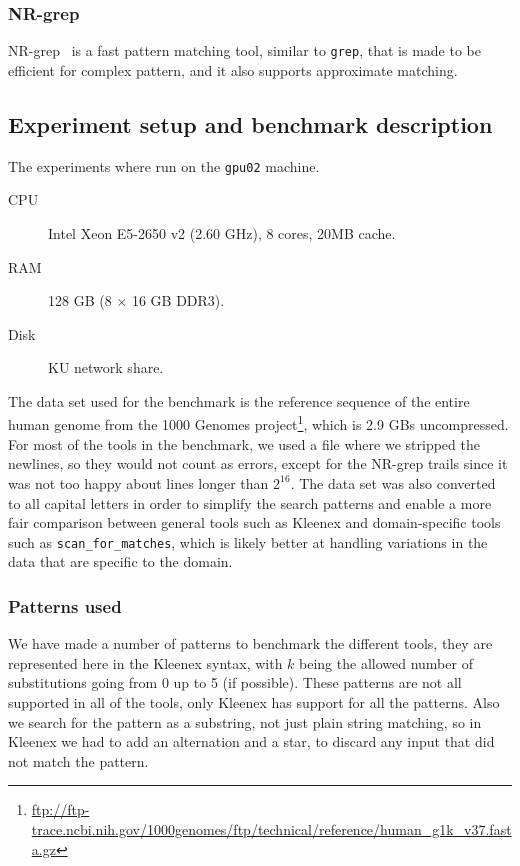 \subsubsection{NR-grep}
NR-grep~\cite{navarro2001nr} is a fast pattern matching tool, similar to
\texttt{grep}, that is made to be efficient for complex pattern, and it also
supports approximate matching.

\subsection{Experiment setup and benchmark description}
The experiments where run on the \texttt{gpu02} machine.
\begin{description}
    \item[CPU] Intel Xeon E5-2650 v2 (2.60 GHz), 8 cores, 20MB cache.
    \item[RAM] 128 GB (8 $\times$ 16 GB DDR3).
    \item[Disk] KU network share.
\end{description}

The data set used for the benchmark is the reference sequence of the entire
human genome from the 1000 Genomes
project\footnote{\url{ftp://ftp-trace.ncbi.nih.gov/1000genomes/ftp/technical/reference/human_g1k_v37.fasta.gz}},
which is 2.9 GBs uncompressed. For most of the tools in the benchmark, we used
a file where we stripped the newlines, so they would not count as errors,
except for the NR-grep trails since it was not too happy about lines longer
than $2^{16}$. The data set was also converted to all capital letters in order
to simplify the search patterns and enable a more fair comparison between
general tools such as Kleenex and domain-specific tools such as
\texttt{scan\_for\_matches}, which is likely better at handling variations in
the data that are specific to the domain.

\subsubsection{Patterns used}
We have made a number of patterns to benchmark the different tools, they are
represented here in the Kleenex syntax, with $k$ being the allowed number of
substitutions going from 0 up to 5 (if possible). These patterns are not all
supported in all of the tools, only Kleenex has support for all the
patterns. Also we search for the pattern as a substring, not just plain string
matching, so in Kleenex we had to add an alternation and a star, to discard any
input that did not match the pattern.

